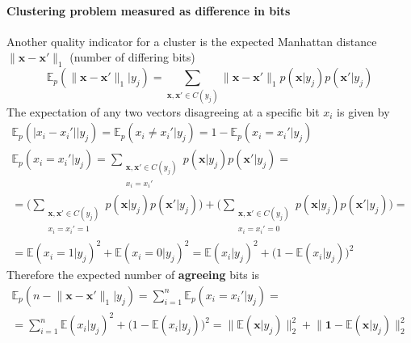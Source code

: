 \documentclass[12pt]{article}
\begin{document}
\paragraph{Clustering problem measured as difference in bits}
Another  quality indicator for a cluster is the expected Manhattan distance $\lVert \boldsymbol{x} - \boldsymbol{x}' \rVert_1$ (number of differing bits)
\[
\mathbb{E}_p(\lVert \boldsymbol{x} - \boldsymbol{x}' \rVert_1|y_j) = \sum_{\boldsymbol{x},\boldsymbol{x}'\in C(y_j)} \lVert \boldsymbol{x} - \boldsymbol{x}' \rVert_1 p(\boldsymbol{x}|y_j)p(\boldsymbol{x}'|y_j)
\]
The expectation of any two vectors disagreeing at a specific bit $x_i$ is given by
\begin{gather*}
	\mathbb{E}_p(|x_i - x_i'| | y_j)  = \mathbb{E}_p(x_i \ne x_i' | y_j) = 1 - \mathbb{E}_p(x_i = x_i' | y_j) \\
	\mathbb{E}_p(x_i = x_i' | y_j) =	\sum_{\substack{\boldsymbol{x},\boldsymbol{x}'\in C(y_j) \\ x_i= x_i'}} p(\boldsymbol{x}|y_j)p(\boldsymbol{x}'|y_j) = \\
    = \big( \sum_{\substack{\boldsymbol{x},\boldsymbol{x}'\in C(y_j) \\ x_i= x_i'=1}} p(\boldsymbol{x}|y_j)p(\boldsymbol{x}'|y_j)\big) + \big( \sum_{\substack{\boldsymbol{x},\boldsymbol{x}'\in C(y_j) \\ x_i= x_i'=0}} p(\boldsymbol{x}|y_j)p(\boldsymbol{x}'|y_j)\big) = \\
    = \mathbb{E}(x_i=1|y_j)^2 + \mathbb{E}(x_i=0|y_j)^2  = \mathbb{E}(x_i|y_j)^2 + \big(1-\mathbb{E}(x_i|y_j)\big)^2 
\end{gather*}
Therefore the expected number of \textbf{agreeing} bits is 
\begin{gather*}
\mathbb{E}_p(n - \lVert \boldsymbol{x} - \boldsymbol{x}' \rVert_1|y_j) = 
\sum_{i=1}^n \mathbb{E}_p(x_i = x_i' | y_j) = \\
=  \sum_{i=1}^n \mathbb{E}(x_i|y_j)^2 + \big(1-\mathbb{E}(x_i|y_j)\big)^2 = \lVert \mathbb{E}(\boldsymbol{x}|y_j)\rVert_2^2 + \lVert \boldsymbol{1}-\mathbb{E}(\boldsymbol{x}|y_j)\rVert_2^2
\end{gather*}
\end{document}
